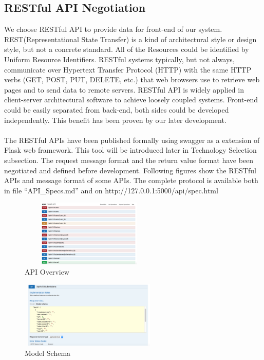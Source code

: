 \documentclass[12pt,oneside,a4paper]{article}
\begin{document}
\subsection{\large RESTful API Negotiation}
We choose RESTful API to provide data for front-end of our system. REST(Representational State Transfer) is a kind of architectural style or design style, but not a concrete standard. All of the Resources could be identified by Uniform Resource Identifiers. RESTful systems typically, but not always, communicate over Hypertext Transfer Protocol (HTTP) with the same HTTP verbs (GET, POST, PUT, DELETE, etc.) that web browsers use to retrieve web pages and to send data to remote servers. RESTful API is widely applied in client-server architectural software to achieve loosely coupled systems. Front-end could be easily separated from back-end, both sides could be developed independently. This benefit has been proven by our later development.\\\\
The RESTful APIs have been published formally using swagger as a extension of Flask web framework. This tool will be introduced later in Technology Selection subsection. The request message format and the return value format have been negotiated and defined before development. Following figures show the RESTful APIs and message format of some APIs. The complete protocol is available both in file ``API\_Specs.md'' and on http://127.0.0.1:5000/api/spec.html\\
\begin{figure}[htb]
\centering
\includegraphics[width=250px, height=120px]{api.png}
\caption{API Overview}
\label{picture-label6}
\end{figure}
\begin{figure}[htb]
\centering
\includegraphics[width=250px, height=120px]{api2.png}
\caption{Model Schema}
\label{picture-label7}
\end{figure}
\end{document}
